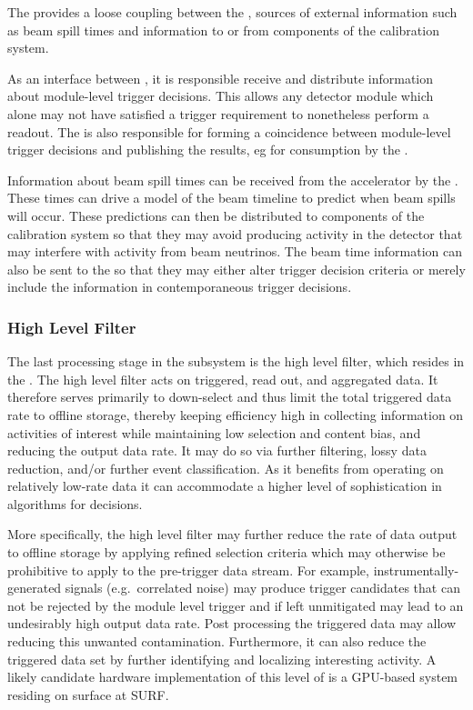 The  provides a loose coupling between the , sources of external information such as beam spill times and information to or from components of the calibration system. 

As an interface between , it is responsible receive and distribute information about module-level  trigger decisions.
This allows any detector module which alone may not have satisfied a  trigger requirement to nonetheless perform a  readout.
The  is also responsible for forming a coincidence between module-level  trigger decisions and publishing the results, eg for consumption by the .

Information about beam spill times can be received from the accelerator by the . 
These times can drive a model of the beam timeline to predict when beam spills will occur. 
These predictions can then be distributed to components of the calibration system so that they may avoid producing activity in the detector that may interfere with activity from beam neutrinos.
The beam time information can also be sent to the  so that they may either alter trigger decision criteria or merely include the information in contemporaneous trigger decisions.



\subsubsection{High Level Filter}
\label{sec:fd-daq:design-data-reduction}

The last processing stage in the  subsystem is the
high level filter, which resides in the .
The high level filter acts on triggered, read out, and aggregated data. 
It therefore serves primarily to down-select and thus
limit the total triggered data rate to offline storage, thereby keeping 
efficiency high in collecting information on activities of interest
while maintaining low selection and content bias, and reducing the output data
rate. It may do so via 
further filtering, lossy data reduction, and/or further event
classification.
As it benefits from operating on relatively low-rate data it can accommodate a higher level of
sophistication in algorithms for  decisions.

More specifically, the high level filter may further reduce the rate of data output to offline storage by
applying refined selection criteria which may otherwise be prohibitive
to apply to the pre-trigger data stream.  For example, instrumentally-generated signals (e.g.~correlated noise)
may produce trigger candidates that can not be rejected by the module
level trigger and if left unmitigated may lead to an undesirably high
output data rate. 
Post processing the triggered data may allow reducing this unwanted
contamination.
Furthermore, it can also reduce the triggered data set by further identifying
and localizing interesting activity. A likely candidate hardware
implementation of this level of  is a GPU-based system
residing on surface at SURF\cite{georgia-add-something}.

